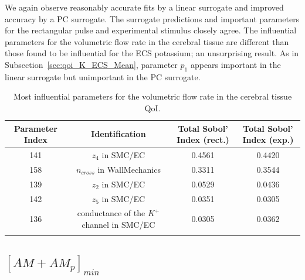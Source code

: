 We again observe reasonably accurate fits by a linear surrogate and improved accuracy by a PC surrogate. The surrogate predictions and important parameters for the rectangular pulse and experimental stimulus closely agree. The influential parameters for the volumetric flow rate in the cerebral tissue are different than those found to be influential for the ECS potassium; an unsurprising result. As in Subsection~\ref{sec:qoi_K_ECS_Mean}, parameter $p_1$ appears important in the linear surrogate but unimportant in the PC surrogate.

\begin{table}[h]
\centering
{}
\begin{tabular}{cccc}
\toprule
Parameter Index & Identification & Total Sobol' Index (rect.) & Total Sobol' Index (exp.)\\
\midrule
141 &  $z_4$ in SMC/EC & 0.4561 & 0.4420\\
158 & $n_{cross}$ in WallMechanics & 0.3311 & 0.3544\\ 
 139 & $z_2$ in SMC/EC & 0.0529 & 0.0436\\
 142 & $z_5$ in SMC/EC &  0.0351 &0.0305\\
  136 & conductance of the $K^+$ channel in SMC/EC & 0.0305 &0.0362\\
   \arrayrulecolor{black}\bottomrule
\end{tabular}
\caption{Most influential parameters for the volumetric flow rate in the cerebral tissue QoI.}
\label{tab:qoi_vol_flow}
\end{table}

\subsection{$[AM+AM_p]_{min}$}

